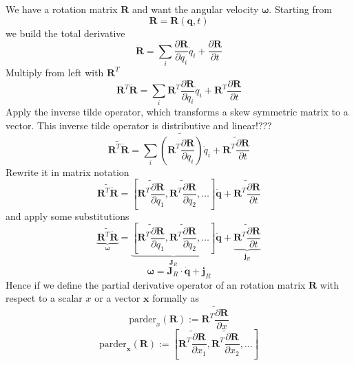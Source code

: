 \documentclass{report}
\newcommand{\bs}[1]{\boldsymbol #1}
\begin{document}
We have a rotation matrix $\bs{R}$ and want the angular velocity $\bs{\omega}$. Starting from
\begin{equation}
\bs{R}=\bs{R}(\bs{q},t)
\end{equation}
we build the total derivative
\begin{equation}
\dot{\bs{R}}=\sum_i \frac{\partial \bs{R}}{\partial q_i}\dot{q}_i + \frac{\partial \bs{R}}{\partial t}
\end{equation}
Multiply from left with $\bs{R}^T$
\begin{equation}
\bs{R}^T\dot{\bs{R}}=\sum_i \bs{R}^T\frac{\partial \bs{R}}{\partial q_i}\dot{q}_i + \bs{R}^T\frac{\partial \bs{R}}{\partial t}
\end{equation}
Apply the inverse tilde operator, which transforms a skew symmetric matrix to a vector. This inverse tilde operator is distributive and linear!???
\begin{equation}
\widetilde{\bs{R}^T\dot{\bs{R}}}=\sum_i \widetilde{\left(\bs{R}^T\frac{\partial \bs{R}}{\partial q_i}\right)}\dot{q}_i + \widetilde{\bs{R}^T\frac{\partial \bs{R}}{\partial t}}
\end{equation}
Rewrite it in matrix notation
\begin{equation}
\widetilde{\bs{R}^T\dot{\bs{R}}}=\left[\widetilde{\bs{R}^T\frac{\partial \bs{R}}{\partial q_1}},\widetilde{\bs{R}^T\frac{\partial \bs{R}}{\partial q_2}},\dots\right]\dot{\bs{q}} + \widetilde{\bs{R}^T\frac{\partial \bs{R}}{\partial t}}
\end{equation}
and apply some substitutions
\begin{equation}
\underbrace{\widetilde{\bs{R}^T\dot{\bs{R}}}}_{\bs{\omega}}=\underbrace{\left[\widetilde{\bs{R}^T\frac{\partial \bs{R}}{\partial q_1}},\widetilde{\bs{R}^T\frac{\partial \bs{R}}{\partial q_2}},\dots\right]}_{\bs{J}_R}\dot{\bs{q}} + \underbrace{\widetilde{\bs{R}^T\frac{\partial \bs{R}}{\partial t}}}_{\bs{j}_R}
\end{equation}
\begin{equation}
\bs{\omega}=\bs{J}_R\cdot \dot{\bs{q}} + \bs{j}_R
\end{equation}
Hence if we define the partial derivative operator of an rotation matrix $\bs{R}$ with respect to a scalar $x$ or a vector $\bs{x}$ formally as
\begin{equation}
\text{parder}_x(\bs{R}):=\widetilde{\bs{R}^T\frac{\partial\bs{R}}{\partial x}}
\end{equation}
\begin{equation}
\text{parder}_{\bs{x}}(\bs{R}):=\left[\widetilde{\bs{R}^T\frac{\partial\bs{R}}{\partial x_1}},\widetilde{\bs{R}^T\frac{\partial\bs{R}}{\partial x_2}},\dots\right]
\end{equation}
\end{document}
